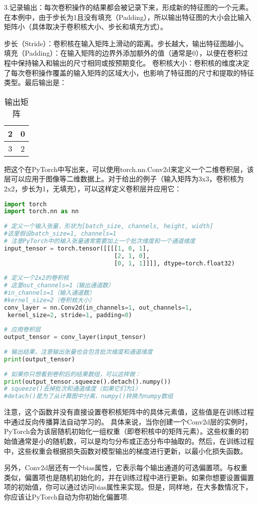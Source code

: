 3.记录输出：每次卷积操作的结果都会被记录下来，形成新的特征图的一个元素。在本例中，由于步长为1且没有填充（Padding），所以输出特征图的大小会比输入矩阵小（具体取决于卷积核大小、步长和填充方式）。

步长（Stride）：卷积核在输入矩阵上滑动的距离。步长越大，输出特征图越小。
填充（Padding）：在输入矩阵的边界外添加额外的值（通常是0），以便在卷积过程中保持输入和输出的尺寸相同或按预期变化。
卷积核大小：卷积核的维度决定了每次卷积操作覆盖的输入矩阵的区域大小，也影响了特征图的尺寸和提取的特征类型。
​
最后输出是：\begin{table}[ht]
\centering
\caption{输出矩阵}\label{tab_CNN24}
\begin{tabular}{|c|c|}
\hline
2 & 0 \\
\hline
3 & 2 \\
\hline
\end{tabular}
\end{table}

把这个在PyTorch中写出来，可以使用torch.nn.Conv2d来定义一个二维卷积层，该层可以应用于图像等二维数据上。对于给出的例子（输入矩阵为3x3，卷积核为2x2，步长为1，无填充），可以这样定义卷积层并应用它：


\begin{lstlisting}[language=python]
import torch  
import torch.nn as nn  
  
# 定义一个输入张量，形状为[batch_size, channels, height, width]
#这里假设batch_size=1, channels=1  
# 注意PyTorch中的输入张量通常需要加上一个批次维度和一个通道维度  
input_tensor = torch.tensor([[[[1, 0, 1],  
                               [2, 1, 0],  
                               [0, 1, 1]]]], dtype=torch.float32)  
  
# 定义一个2x2的卷积核
# 这里out_channels=1（输出通道数）
#in_channels=1（输入通道数）
#kernel_size=2（卷积核大小）  
conv_layer = nn.Conv2d(in_channels=1, out_channels=1,
 kernel_size=2, stride=1, padding=0)  
  
# 应用卷积层  
output_tensor = conv_layer(input_tensor)  
  
# 输出结果，注意输出张量也会包含批次维度和通道维度  
print(output_tensor)  
  
# 如果你只想看到卷积后的结果数组，可以这样做：  
print(output_tensor.squeeze().detach().numpy())  
# squeeze()去掉批次和通道维度（如果它们为1）
#detach()是为了从计算图中分离，numpy()转换为numpy数组
\end{lstlisting}

注意，这个函数并没有直接设置卷积核矩阵中的具体元素值，这些值是在训练过程中通过反向传播算法自动学习的。
具体来说，当你创建一个Conv2d层的实例时，PyTorch会为该层随机初始化一组权重（即卷积核中的矩阵元素）。这些权重的初始值通常是小的随机数，可以是均匀分布或正态分布中抽取的。然后，在训练过程中，这些权重会根据损失函数对模型输出的梯度进行更新，以最小化损失函数。

另外，Conv2d层还有一个bias属性，它表示每个输出通道的可选偏置项。与权重类似，偏置项也是随机初始化的，并在训练过程中进行更新。如果你想要设置偏置项的初始值，你可以通过访问bias属性来实现。但是，同样地，在大多数情况下，你应该让PyTorch自动为你初始化偏置项.
